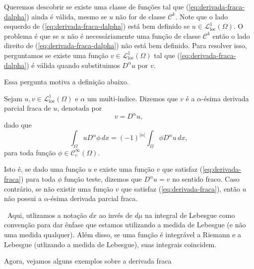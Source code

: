 \documentclass[a4paper, 11pt]{book}
\theoremstyle{definition}
\newcommand{\obs}{\noindent{\textbf{\textcolor{black}{\sffamily Observação:}}}~}
\newcommand{\cC}{\mathcal{C}}
\newcommand{\cL}{\mathcal{L}}
\begin{document}
Queremos descobrir se existe uma classe de funções tal que (\ref{eq:derivada-fraca-dalpha}) ainda é válida, mesmo se $u$ não for de classe $\cC ^k$. Note que o lado esquerdo de (\ref{eq:derivada-fraca-dalpha}) está bem definido se $u \in \cL^1_{\mathrm{loc}}(\Omega)$.
O problema é que se $u$ não é necessáriamente uma função de classe $\cC^k$ então o lado direito de (\ref{eq:derivada-fraca-dalpha}) não está bem definido. Para resolver isso, perguntamos se existe uma função $v \in \cL^1_{\mathrm{loc}}(\Omega)$ tal que (\ref{eq:derivada-fraca-dalpha}) é válida quando substituimos $D^\alpha u$ por $v$.

Essa pergunta motiva a definição abaixo.

\begin{dbox}
    Sejam $u,v \in \cL^1_{\mathrm{loc}}(\Omega)$ e $\alpha$ um multi-índice. Dizemos que $v$ é a $\alpha$-ésima derivada parcial fraca de $u$, denotada por
    \[
        v = D^\alpha u,
    \]
    dado que
    \begin{equation} \label{eq:derivada-fraca}
        \int_\Omega u D^\alpha \phi \,dx = (-1)^{|\alpha|} \int_\Omega \phi D^\alpha u\,dx,
    \end{equation}
    para toda função $\phi \in \cC ^\infty_c(\Omega)$.
\end{dbox}

Isto é, se dado uma função $u$ e existe uma função $v$ que satisfaz (\ref{eq:derivada-fraca}) para toda $\phi$ função teste, dizemos que $D^\alpha u = v$ no sentido fraco.
Caso contrário, se não existir uma função $v$ que satisfaz (\ref{eq:derivada-fraca}), então $u$ não possui a $\alpha$-ésima derivada parcial fraca.

\obs Aqui, utlizamos a notação $dx$ ao invés de $d\mu$ na integral de Lebesgue como convenção para dar ênfase que estamos utilizando a medida de Lebesgue (e não uma medida qualquer).
Além disso, se uma função é integrável a Riemann e a Lebesgue (utlizando a medida de Lebesgue), suas integrais coincidem.

Agora, vejamos alguns exemplos sobre a derivada fraca
\end{document}
